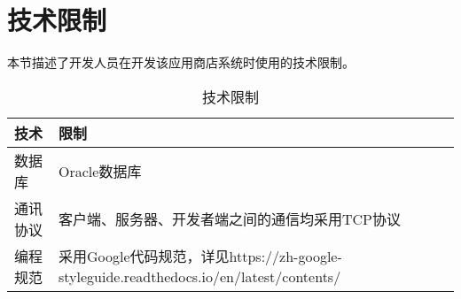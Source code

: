 \section{技术限制}
本节描述了开发人员在开发该应用商店系统时使用的技术限制。\\
\begin{longtable}{|p{4cm}|p{10cm}|}
\caption{技术限制}\label{tab:technical_constraints} \\
\hline
技术 & 限制\\
\hline
数据库 & Oracle数据库\\
通讯协议 & 客户端、服务器、开发者端之间的通信均采用TCP协议\\
编程规范 & 采用Google代码规范，详见https://zh-google-styleguide.readthedocs.io/en/latest/contents/\\
\hline
\end{longtable}
